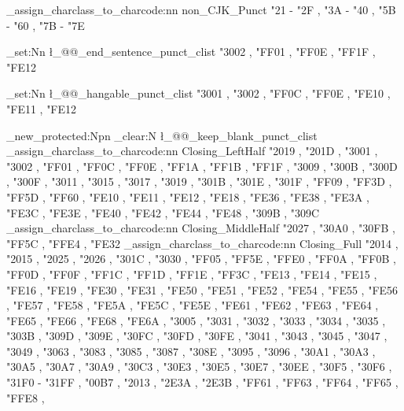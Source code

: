 \@@_assign_charclass_to_charcode:nn { non_CJK_Punct }
  {
    "21 - "2F ,
    "3A - "40 ,
    "5B - "60 ,
    "7B - "7E
  }

\clist_set:Nn \l_@@_end_sentence_punct_clist
  {
    "3002 , "FF01 , "FF0E , "FF1F , "FE12
  }

\clist_set:Nn \l_@@_hangable_punct_clist
  {
    "3001 , "3002 , "FF0C , "FF0E ,
    "FE10 , "FE11 , "FE12
  }

\cs_new_protected:Npn \ChineseSimplifiedH
  {
    \clist_clear:N \l_@@_keep_blank_punct_clist
    \@@_assign_charclass_to_charcode:nn { Closing_LeftHalf }
      {
        "2019 , "201D ,
        "3001 , "3002 , "FF01 , "FF0C , "FF0E ,
        "FF1A , "FF1B , "FF1F ,
        "3009 , "300B , "300D , "300F , "3011 ,
        "3015 , "3017 , "3019 , "301B , "301E ,
        "301F , "FF09 , "FF3D , "FF5D , "FF60 ,
        "FE10 , "FE11 , "FE12 ,
        "FE18 , "FE36 , "FE38 , "FE3A , "FE3C ,
        "FE3E , "FE40 , "FE42 , "FE44 , "FE48 ,
        "309B , "309C
      }
    \@@_assign_charclass_to_charcode:nn { Closing_MiddleHalf }
      {
        "2027 ,
        "30A0 , "30FB ,
        "FF5C , "FFE4 ,
        "FE32
      }
    \@@_assign_charclass_to_charcode:nn { Closing_Full }
      {
        "2014 , "2015 , "2025 , "2026 ,
        "301C , "3030 , "FF05 , "FF5E , "FFE0 ,
        "FF0A , "FF0B , "FF0D , "FF0F ,
        "FF1C , "FF1D , "FF1E , "FF3C ,
        "FE13 ,
        "FE14 , "FE15 , "FE16 , "FE19 , "FE30 ,
        "FE31 ,
        "FE50 , "FE51 , "FE52 , "FE54 , "FE55 ,
        "FE56 , "FE57 , "FE58 , "FE5A , "FE5C ,
        "FE5E , "FE61 , "FE62 , "FE63 , "FE64 ,
        "FE65 , "FE66 , "FE68 , "FE6A ,
        "3005 , "3031 , "3032 , "3033 , "3034 ,
        "3035 , "303B , "309D , "309E , "30FC ,
        "30FD , "30FE ,
        "3041 , "3043 , "3045 , "3047 , "3049 ,
        "3063 , "3083 , "3085 , "3087 , "308E ,
        "3095 , "3096 ,
        "30A1 , "30A3 , "30A5 , "30A7 , "30A9 ,
        "30C3 , "30E3 , "30E5 , "30E7 , "30EE ,
        "30F5 , "30F6 ,
        "31F0 - "31FF ,
        "00B7 , "2013 , "2E3A , "2E3B ,
        "FF61 , "FF63 , "FF64 , "FF65 , "FFE8 ,
}}
